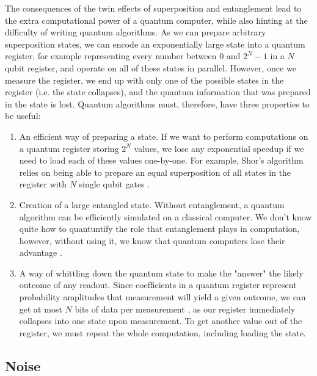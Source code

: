 The consequences of the twin effects of superposition and entanglement lead to the extra computational
power of a quantum computer, while also hinting at the difficulty of writing quantum algorithms. As we
can prepare arbitrary superposition states, we can encode an exponentially large
state into a quantum register, for example representing every number between 0 and $2^N-1$ in a $N$ qubit
register, and operate on all of these states in parallel. However, once we measure the register, we end up
with only one of the possible states in the register (i.e. the state collapses), and the quantum information
that was prepared in the state is lost. Quantum algorithms must, therefore, have three properties to be useful:
\begin{enumerate}
  \item An efficient way of preparing a state. If we want to perform computations on a quantum register
    storing $2^N$ values, we lose any exponential speedup if we need to load each of these values one-by-one.
    For example, Shor's algorithm relies on being able to prepare an equal superposition of all states
    in the register with $N$ single qubit gates \cite{PhysRevA.54.1034}.
  \item Creation of a large entangled state. Without entanglement, a quantum algorithm can be efficiently
    simulated on a classical computer. We don't know quite how to quantuntify the role that entanglement plays in computation,
    however, without using it, we know that quantum computers lose their advantage \cite{doi:10.1098/rspa.2002.1097}.
  \item A way of whittling down the quantum state to make the "answer" the likely outcome of any readout.
    Since coefficients in a quantum register represent probability amplitudes that measurement will yield
    a given outcome, we can get at most $N$ bits of data per measurement \cite{651037}, as our register
    immediately collapses into one state upon measurement. To get another value out of the register,
    we must repeat the whole computation, including loading the state.
\end{enumerate}

\subsection{Noise}

